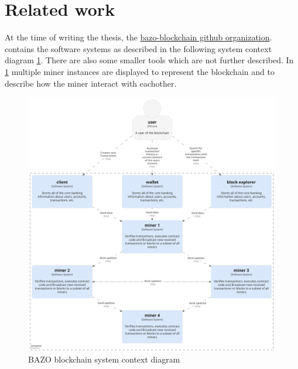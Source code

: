 \section{Related work}
At the time of writing the thesis, the \href{https://github.com/bazo-blockchain}{bazo-blockchain github organization}. contains the software systems as described in the following system context diagram \ref{systemcontextdiagram}. There are also some smaller tools which are not further described. In \ref{systemcontextdiagram} multiple miner instances are displayed to represent the blockchain and to describe how the miner interact with eachother.

\begin{figure}[H]
	\begin{center}
	\includegraphics[width=\textwidth]{./images/BAZO_System_Context}
	\caption{BAZO blockchain system context diagram}
	\label{systemcontextdiagram}
	\end{center}
\end{figure}
\pagebreak

